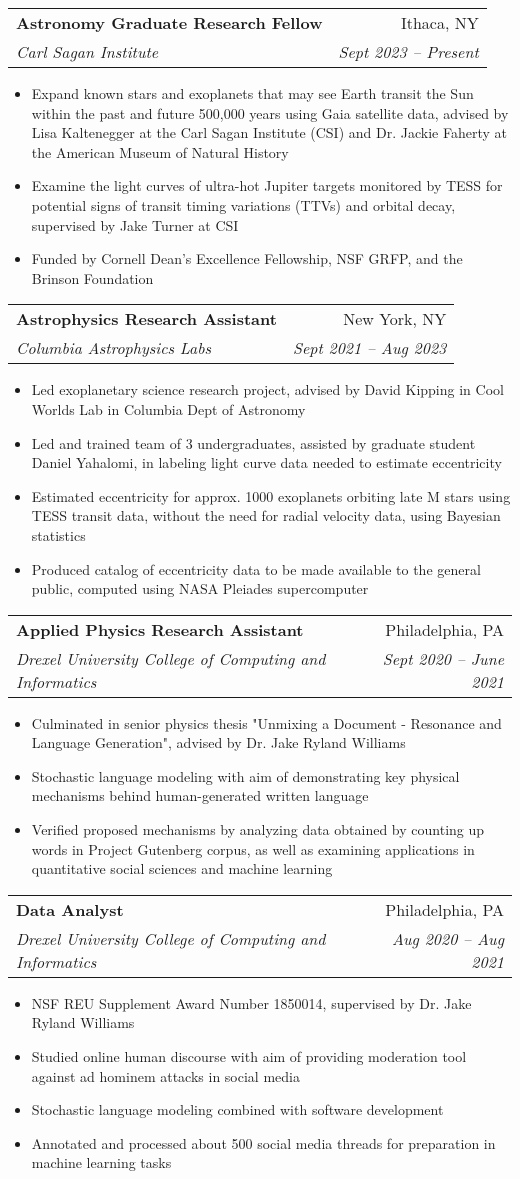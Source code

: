 \documentclass[a4paper,11pt]{article}
\makeatletter
\newcommand{\resumeItem}[1]{
  \item\small{
    {#1 \vspace{-2pt}}
  }
}
\newcommand{\resumeSubheading}[4]{
  \vspace{-2pt}\item
    \begin{tabular*}{0.97\textwidth}[t]{l@{\extracolsep{\fill}}r}
      \textbf{#1} & #2 \\
      \textit{\small#3} & \textit{\small #4} \\
    \end{tabular*}\vspace{-7pt}
}
\newcommand{\resumeItemListStart}{\begin{itemize}}
\newcommand{\resumeItemListEnd}{\end{itemize}\vspace{-5pt}}
\makeatother
\begin{document}
  \resumeSubheading
      {Astronomy Graduate Research Fellow}{Ithaca, NY}
      {Carl Sagan Institute}{Sept 2023 -- Present}
      \resumeItemListStart
        \resumeItem{Expand known stars and exoplanets that may see Earth transit the Sun within the past and future 500,000 years using Gaia satellite data, advised by Lisa Kaltenegger at the Carl Sagan Institute (CSI) and Dr. Jackie Faherty at the American Museum of Natural History}
        \resumeItem{Examine the light curves of ultra-hot Jupiter targets monitored by TESS for potential signs of transit timing variations (TTVs) and orbital decay, supervised by Jake Turner at CSI}
        \resumeItem{Funded by Cornell Dean's Excellence Fellowship, NSF GRFP, and the Brinson Foundation}
      \resumeItemListEnd

    \resumeSubheading
      {Astrophysics Research Assistant}{New York, NY}
      {Columbia Astrophysics Labs}{Sept 2021 -- Aug 2023}
      \resumeItemListStart
        \resumeItem{Led exoplanetary science research project, advised by David Kipping in Cool Worlds Lab in Columbia Dept of Astronomy}
        \resumeItem{Led and trained team of 3 undergraduates, assisted by graduate student Daniel Yahalomi, in labeling light curve data needed to estimate eccentricity}
        \resumeItem{Estimated eccentricity for approx. 1000 exoplanets orbiting late M stars using TESS transit data, without the need for radial velocity data, using Bayesian statistics}
        \resumeItem{Produced catalog of eccentricity data to be made available to the general public, computed using NASA Pleiades supercomputer}
      \resumeItemListEnd
  
    \resumeSubheading
      {Applied Physics Research Assistant}{Philadelphia, PA}
      {Drexel University College of Computing and Informatics}{Sept 2020 -- June 2021}
      \resumeItemListStart
        \resumeItem{Culminated in senior physics thesis "Unmixing a Document - Resonance and Language Generation", advised by Dr. Jake Ryland Williams}
        \resumeItem{Stochastic language modeling with aim of demonstrating key physical mechanisms behind human-generated written language}
        \resumeItem{Verified proposed mechanisms by analyzing data obtained by counting up words in Project Gutenberg corpus, as well as examining applications in quantitative social sciences and machine learning}
      \resumeItemListEnd

    \resumeSubheading
      {Data Analyst}{Philadelphia, PA}
      {Drexel University College of Computing and Informatics}{Aug 2020 -- Aug 2021}
      \resumeItemListStart
        \resumeItem{NSF REU Supplement Award Number 1850014, supervised by Dr. Jake Ryland Williams}
        \resumeItem{Studied online human discourse with aim of providing moderation tool against ad hominem attacks in social media}
        \resumeItem{Stochastic language modeling combined with software development}
        \resumeItem{Annotated and processed about 500 social media threads for preparation in machine learning tasks}
      \resumeItemListEnd
      
\end{document}

